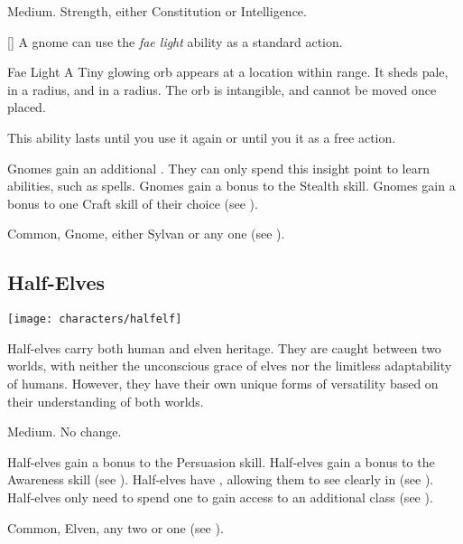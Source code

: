          Medium.
          Strength, either  Constitution or  Intelligence.
        \begin{raggeditemize}
            [\sparkle] A gnome can use the \textit{fae light} ability as a standard action.
                \begin{activeability}{Fae Light}
                    \rankline
                    A Tiny glowing orb appears at a location within \rngmed range.
                    It sheds pale,  in a \areasmall radius, and  in a \areamed radius.
                    The orb is intangible, and cannot be moved once placed.

                    This ability lasts until you use it again or until you  it as a free action.
                \end{activeability}
             Gnomes gain an additional .
                They can only spend this insight point to learn \magical abilities, such as spells.
             Gnomes gain a  bonus to the Stealth skill.
             Gnomes gain a  bonus to one Craft skill of their choice (see ).
        \end{raggeditemize}
         Common, Gnome, either Sylvan or any one  (see ).

    \subsection{Half-Elves}\label{Half-Elves}
        \texttt{[image: characters/halfelf]}

        Half-elves carry both human and elven heritage.
        They are caught between two worlds, with neither the unconscious grace of elves nor the limitless adaptability of humans.
        However, they have their own unique forms of versatility based on their understanding of both worlds.

         Medium.
         No change.
        \begin{raggeditemize}
             Half-elves gain a  bonus to the Persuasion skill.
             Half-elves gain a  bonus to the Awareness skill (see ).
             Half-elves have , allowing them to see clearly in  (see ).
             Half-elves only need to spend one  to gain access to an additional class (see ).
        \end{raggeditemize}
         Common, Elven, any two  or one  (see ).

